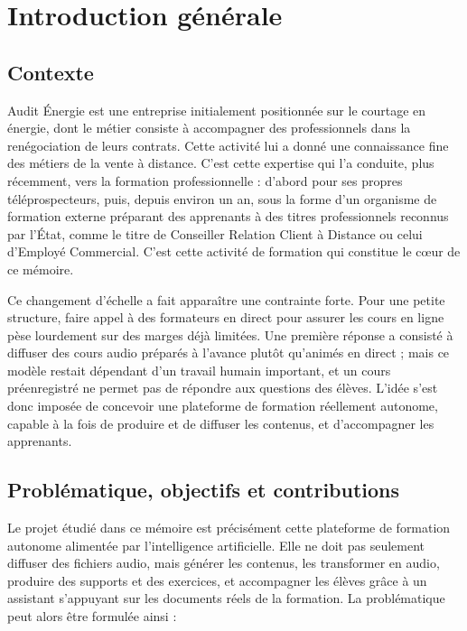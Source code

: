 \section*{Introduction générale}

\subsection*{Contexte}

Audit Énergie est une entreprise initialement positionnée sur le courtage en énergie, dont
le métier consiste à accompagner des professionnels dans la renégociation de leurs contrats.
Cette activité lui a donné une connaissance fine des métiers de la vente à distance. C'est
cette expertise qui l'a conduite, plus récemment, vers la formation professionnelle :
d'abord pour ses propres téléprospecteurs, puis, depuis environ un an, sous la forme d'un
organisme de formation externe préparant des apprenants à des titres professionnels reconnus
par l'État, comme le titre de Conseiller Relation Client à Distance ou celui d'Employé
Commercial. C'est cette activité de formation qui constitue le cœur de ce mémoire.

Ce changement d'échelle a fait apparaître une contrainte forte. Pour une petite structure,
faire appel à des formateurs en direct pour assurer les cours en ligne pèse lourdement sur
des marges déjà limitées. Une première réponse a consisté à diffuser des cours audio préparés
à l'avance plutôt qu'animés en direct ; mais ce modèle restait dépendant d'un travail humain
important, et un cours préenregistré ne permet pas de répondre aux questions des élèves.
L'idée s'est donc imposée de concevoir une plateforme de formation réellement autonome,
capable à la fois de produire et de diffuser les contenus, et d'accompagner les apprenants.

\subsection*{Problématique, objectifs et contributions}

Le projet étudié dans ce mémoire est précisément cette plateforme de formation autonome
alimentée par l'intelligence artificielle. Elle ne doit pas seulement diffuser des fichiers
audio, mais générer les contenus, les transformer en audio, produire des supports et des
exercices, et accompagner les élèves grâce à un assistant s'appuyant sur les documents réels
de la formation. La problématique peut alors être formulée ainsi :

